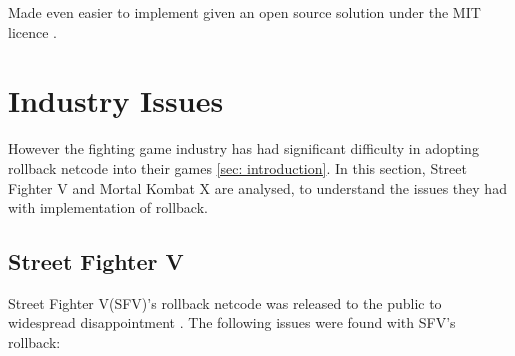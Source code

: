 \documentclass{entcs}
\begin{document}
Made even easier to implement given an open source solution under the MIT licence \cite{GGPODocumentation}. 
\section{Industry Issues}
However the fighting game industry has had significant difficulty in adopting rollback netcode into their games \ref{sec: introduction}. In this section, Street Fighter V and Mortal Kombat X are analysed, to understand the issues they had with implementation of rollback.
\subsection{Street Fighter V}
Street Fighter V(SFV)'s rollback netcode was released to the public to widespread disappointment \cite{Netcode 1} \cite{Netcode 2} \cite {Netcode 3} \cite {Netcode 4} \cite{Core-ARollback}.  The following issues were found with SFV's rollback:
\end{document}
